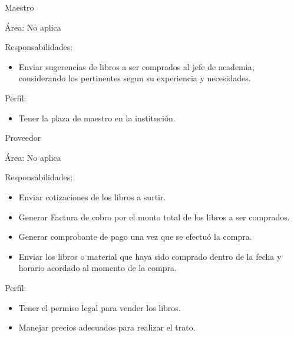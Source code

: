 \begin{Actor}{Maestro}{}
	\item[Área:] No aplica
	\item[Responsabilidades:] \hspace{1pt}
	\begin{itemize}
		\item Enviar sugerencias de libros a ser comprados al jefe de academia, considerando los pertinentes segun su experiencia y necesidades.
	\end{itemize}
	\item[Perfil:] \hspace{1pt}
	\begin{itemize}
		\item Tener la plaza de maestro en la institución.
	\end{itemize}
\end{Actor}

\begin{Actor}{Proveedor}{}
	\item[Área:] No aplica
	\item[Responsabilidades:] \hspace{1pt}
	\begin{itemize}
		\item Enviar cotizaciones de los libros a surtir.
		\item Generar Factura de cobro por el monto total de los libros a ser comprados.
		\item Generar comprobante de pago una vez que se efectuó la compra.
		\item Enviar los libros o material que haya sido comprado dentro de la fecha y horario acordado al momento de la compra.
	\end{itemize}
	\item[Perfil:] \hspace{1pt}
	\begin{itemize}
		\item Tener el permiso legal para  vender los libros.
		\item Manejar precios adecuados para realizar el trato.
	\end{itemize}
\end{Actor}

